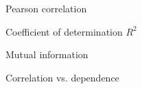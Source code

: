 \documentclass[10pt,compress,t,notes=noshow, xcolor=table]{beamer}
\begin{document}
{
\item Pearson correlation
\item Coefficient of determination $R^2$
\item Mutual information
\item Correlation vs. dependence
}

%
%
%
%
\end{document}
